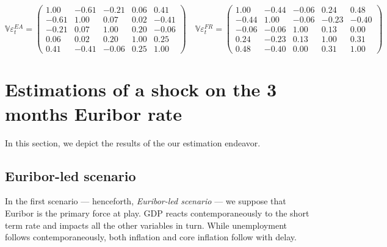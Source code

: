 \documentclass[
  11pt,
]{article}
\begin{document}
\begin{equation}
\mathbb{V}\varepsilon^{EA}_t = 
\begin{pmatrix}
 1.00 & -0.61 & -0.21 & 0.06 & 0.41 \\
-0.61 & 1.00 & 0.07 & 0.02 & -0.41 \\
-0.21 & 0.07 & 1.00 & 0.20 & -0.06 \\
0.06 & 0.02 & 0.20 & 1.00 & 0.25 \\
0.41 & -0.41 & -0.06 & 0.25 & 1.00 
\end{pmatrix}
\quad
\mathbb{V}\varepsilon^{FR}_t = 
\begin{pmatrix}
 1.00 & -0.44 & -0.06 & 0.24 & 0.48 \\
-0.44 & 1.00 & -0.06 & -0.23 & -0.40 \\
-0.06 & -0.06 & 1.00 & 0.13 & 0.00 \\
0.24 & -0.23 & 0.13 & 1.00 & 0.31 \\
0.48 & -0.40 & 0.00 & 0.31 & 1.00 
\end{pmatrix}
\label{eq:variances}
\end{equation}

\hypertarget{sec:est}{%
\section{Estimations of a shock on the 3 months Euribor rate}\label{sec:est}}

In this section, we depict the results of the our estimation endeavor.

\hypertarget{euribor-led-scenario}{%
\subsection{Euribor-led scenario}\label{euribor-led-scenario}}

In the first scenario --- henceforth, \emph{Euribor-led scenario} --- we suppose that Euribor is the primary force at play. GDP reacts contemporaneously to the short term rate and impacts all the other variables in turn. While unemployment follows contemporaneously, both inflation and core inflation follow with delay.
\end{document}
